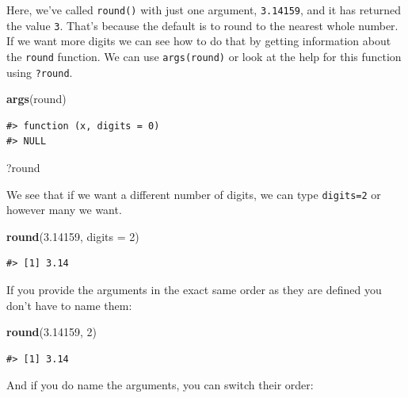 \documentclass[]{book}
\newenvironment{Shaded}{\begin{snugshade}}{\end{snugshade}}
\newcommand{\KeywordTok}[1]{\textcolor[rgb]{0.13,0.29,0.53}{\textbf{{#1}}}}
\newcommand{\DataTypeTok}[1]{\textcolor[rgb]{0.13,0.29,0.53}{{#1}}}
\newcommand{\DecValTok}[1]{\textcolor[rgb]{0.00,0.00,0.81}{{#1}}}
\newcommand{\FloatTok}[1]{\textcolor[rgb]{0.00,0.00,0.81}{{#1}}}
\newcommand{\NormalTok}[1]{{#1}}
\theoremstyle{definition}
\theoremstyle{definition}
\theoremstyle{remark}
\begin{document}
Here, we've called \texttt{round()} with just one argument,
\texttt{3.14159}, and it has returned the value \texttt{3}. That's
because the default is to round to the nearest whole number. If we want
more digits we can see how to do that by getting information about the
\texttt{round} function. We can use \texttt{args(round)} or look at the
help for this function using \texttt{?round}.

\begin{Shaded}
\begin{Highlighting}[]
\KeywordTok{args}\NormalTok{(round)}
\end{Highlighting}
\end{Shaded}

\begin{verbatim}
#> function (x, digits = 0) 
#> NULL
\end{verbatim}

\begin{Shaded}
\begin{Highlighting}[]
\NormalTok{?round}
\end{Highlighting}
\end{Shaded}

We see that if we want a different number of digits, we can type
\texttt{digits=2} or however many we want.

\begin{Shaded}
\begin{Highlighting}[]
\KeywordTok{round}\NormalTok{(}\FloatTok{3.14159}\NormalTok{, }\DataTypeTok{digits =} \DecValTok{2}\NormalTok{)}
\end{Highlighting}
\end{Shaded}

\begin{verbatim}
#> [1] 3.14
\end{verbatim}

If you provide the arguments in the exact same order as they are defined
you don't have to name them:

\begin{Shaded}
\begin{Highlighting}[]
\KeywordTok{round}\NormalTok{(}\FloatTok{3.14159}\NormalTok{, }\DecValTok{2}\NormalTok{)}
\end{Highlighting}
\end{Shaded}

\begin{verbatim}
#> [1] 3.14
\end{verbatim}

And if you do name the arguments, you can switch their order:
\end{document}
